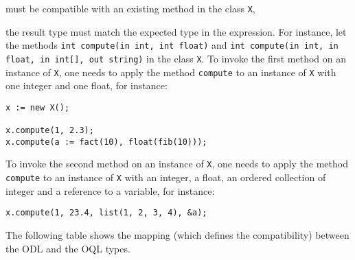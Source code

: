 must be compatible with an existing method in the class \texttt{X},
\item the result type must match the expected type in the expression.
\ee
For instance, let the methods \texttt{int compute(in int, int float)} and
\texttt{int compute(in int, in float, in int[], out string)}
in the class \texttt{X}.
To invoke the first method on an instance of \texttt{X}, one needs to
apply the method \texttt{compute} to an instance of \texttt{X}
with one integer and one float, for instance:
\verbsize
\begin{verbatim}
x := new X();

x.compute(1, 2.3);
x.compute(a := fact(10), float(fib(10)));
\end{verbatim}
\normalsize
To invoke the second method on an instance of \texttt{X}, one needs to
apply the method \texttt{compute} to an instance of \texttt{X}
with an integer, a float, an ordered collection of integer and a reference
to a variable, for instance:
\verbsize
\begin{verbatim}
x.compute(1, 23.4, list(1, 2, 3, 4), &a);
\end{verbatim}
\normalsize
The following table shows the mapping (which defines the compatibility)
between the ODL and the OQL types.
\\
\\
\newcommand{\odlbind}[3]{\hline\hline\texttt{in} #1 & #2\\
\hline \texttt{out} #1 & \texttt{identifier}\\
\hline \texttt{inout} #1 & \texttt{identifier} initialized to a\emph{#3} #2}
\newcommand{\denote}{(\texttt{X} \emph{denotes a class instance})}
\newcommand{\denotex}{(\texttt{X} \emph{denotes any ODL type})}

